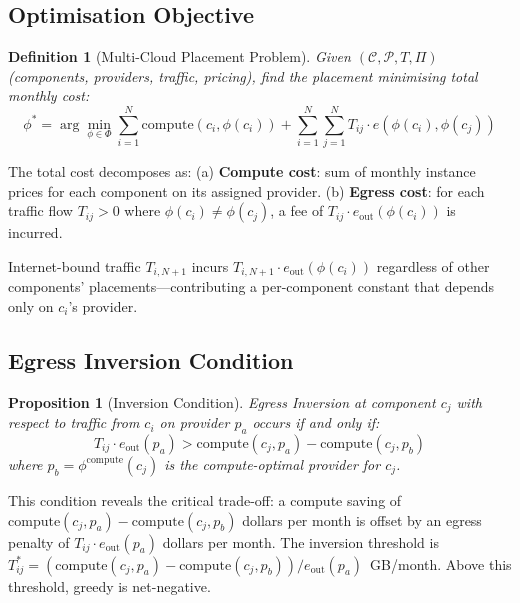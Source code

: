 \documentclass[sigconf,10pt]{acmart}
\newtheorem{definition}{Definition}
\newtheorem{proposition}[theorem]{Proposition}
\begin{document}
\subsection{Optimisation Objective}

\begin{definition}[Multi-Cloud Placement Problem]\label{def:mcpp}
Given $(\mathcal{C}, \mathcal{P}, T, \Pi)$ (components, providers, traffic, pricing),
find the placement minimising total monthly cost:
\begin{equation}\label{eq:mcpp}
\phi^* = \arg\min_{\phi \in \Phi}
  \sum_{i=1}^{N} \text{compute}(c_i,\phi(c_i))
  + \sum_{i=1}^{N}\sum_{j=1}^{N} T_{ij} \cdot e(\phi(c_i),\phi(c_j))
\end{equation}
\end{definition}

The total cost decomposes as:
(a) \textbf{Compute cost}: sum of monthly instance prices for each component on its
assigned provider.
(b) \textbf{Egress cost}: for each traffic flow $T_{ij} > 0$ where $\phi(c_i) \neq \phi(c_j)$,
a fee of $T_{ij} \cdot e_{\text{out}}(\phi(c_i))$ is incurred.

Internet-bound traffic $T_{i,N+1}$ incurs $T_{i,N+1} \cdot e_{\text{out}}(\phi(c_i))$
regardless of other components' placements---contributing a per-component constant that
depends only on $c_i$'s provider.

\subsection{Egress Inversion Condition}

\begin{proposition}[Inversion Condition]\label{prop:inv}
Egress Inversion at component $c_j$ with respect to traffic from $c_i$ on provider
$p_a$ occurs if and only if:
\begin{equation}\label{eq:inv_cond}
T_{ij} \cdot e_{\text{out}}(p_a) > \text{compute}(c_j,p_a) - \text{compute}(c_j,p_b)
\end{equation}
where $p_b = \phi^{\text{compute}}(c_j)$ is the compute-optimal provider for $c_j$.
\end{proposition}

This condition reveals the critical trade-off: a compute saving of
$\text{compute}(c_j,p_a) - \text{compute}(c_j,p_b)$ dollars per month is offset
by an egress penalty of $T_{ij} \cdot e_{\text{out}}(p_a)$ dollars per month.
The inversion threshold is $T_{ij}^* = (\text{compute}(c_j,p_a) - \text{compute}(c_j,p_b)) / e_{\text{out}}(p_a)$~GB/month.
Above this threshold, greedy is net-negative.
\end{document}
